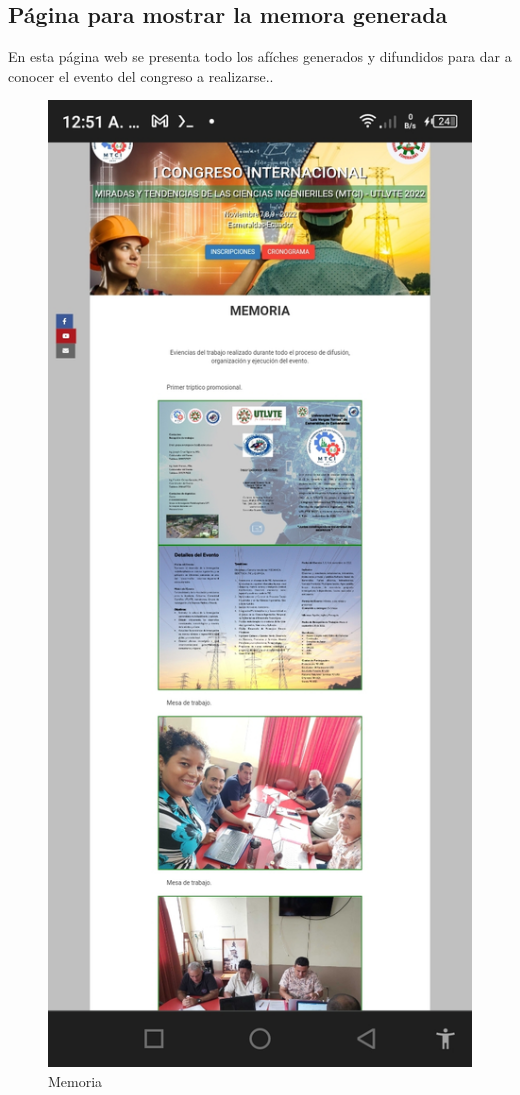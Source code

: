 \documentclass[a4paper,14px]{article}
\begin{document}
  





\newpage
\subsection{Página para mostrar la memora generada}
\label{sec:pagina-principal}

En esta página web se presenta todo los afíches generados y difundidos para dar a conocer el evento del congreso a realizarse..


\begin{figure}[H]
  \centering
  \includegraphics[scale=0.3]{memoria.jpg}
  \caption{Memoria}
  \label{fig:arquitectura}
\end{figure}
\end{document}

